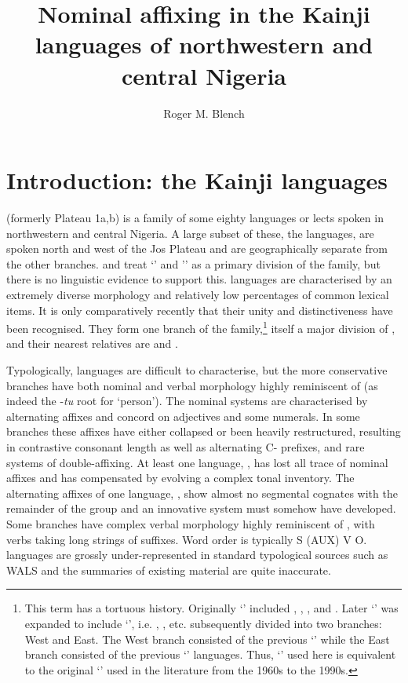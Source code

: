 \documentclass[output=paper]{langsci/langscibook}
\author{Roger M. Blench\affiliation{McDonald Institute for Archaeological Research, University of Cambridge}}
\title{Nominal affixing in the Kainji languages of northwestern and central Nigeria}
\begin{document}
\label{sec:3}


\section{Introduction: the Kainji languages} 

 (formerly Plateau 1a,b) is a family of some eighty languages or lects spoken in northwestern and central Nigeria. A large subset of these, the  languages, are spoken north and west of the Jos Plateau and are geographically separate from the other branches. \citet{Rowlands1962,Greenberg1963,Gerhardt1989} and   \citet{CrozierBlench1992} treat ‘’ and '' as a primary division of the family, but there is no linguistic evidence to support this.  languages are characterised by an extremely diverse morphology and relatively low percentages of common lexical items. It is only comparatively recently that their unity and distinctiveness have been recognised. They form one branch of the  family,\footnote{This term has a tortuous history. Originally ‘’ included , , ,  and . Later ‘’ was expanded to include ‘’, i.e. , , etc.    \citet{WilliamsonBlench2000} subsequently divided  into two branches: West and East. The West branch consisted of the previous ‘’ while the East branch consisted of the previous ‘’ languages. Thus, ‘’ used here is equivalent to the original ‘’ used in the literature from the 1960s to the 1990s.} itself a major division of , and their nearest relatives are  and  \citep{Williamson1971,Williamson1989bco,WilliamsonBlench2000}.

Typologically,  languages are difficult to characterise, but the more conservative branches have both nominal and verbal morphology highly reminiscent of  (as indeed the -\textit{tu} root for ‘person’). The nominal systems are characterised by alternating affixes and concord on adjectives and some numerals. In some branches these affixes have either collapsed or been heavily restructured, resulting in contrastive consonant length as well as alternating C- prefixes, and rare systems of double-affixing. At least one language, , has lost all trace of nominal affixes and has compensated by evolving a complex tonal inventory. The alternating affixes of one language, , show almost no segmental cognates with the remainder of the group and an innovative system must somehow have developed. Some branches have complex verbal morphology highly reminiscent of , with verbs taking long strings of suffixes. Word order is typically S (AUX) V O.  languages are grossly under-represented in standard typological sources such as WALS and the summaries of existing material are quite inaccurate.
\end{document}

